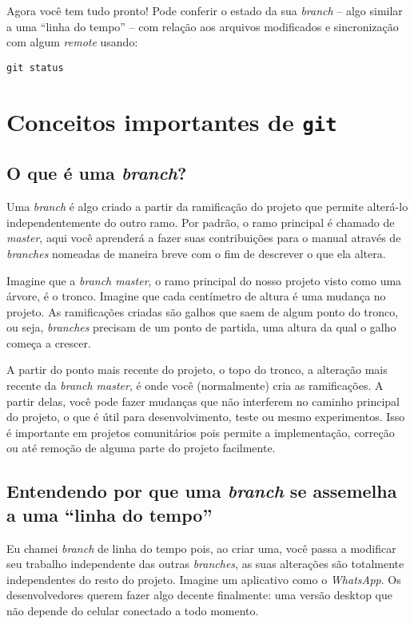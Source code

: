 \documentclass[a4paper,oneside,10pt]{memoir}
\begin{document}
Agora você tem tudo pronto! Pode conferir o estado da sua \emph{branch} --
algo similar a uma ``linha do tempo'' -- com relação aos arquivos modificados
e sincronização com algum \emph{remote} usando:

\begin{center}
\texttt{git status}
\end{center}

\section{Conceitos importantes de \texttt{git}}

\subsection{O que é uma \emph{branch}?}

Uma \emph{branch} é algo criado a partir da ramificação do projeto que permite
alterá-lo independentemente do outro ramo. Por padrão, o ramo principal é
chamado de \emph{master}, aqui você aprenderá a fazer suas contribuições para o
manual através de \emph{branches} nomeadas de maneira breve com o fim de
descrever o que ela altera.

Imagine que a \emph{branch master}, o ramo principal do nosso projeto visto
como uma árvore, é o tronco. Imagine que cada centímetro de altura é uma
mudança no projeto. As ramificações criadas são galhos que saem de algum ponto
do tronco, ou seja, \emph{branches} precisam de um ponto de partida, uma altura
da qual o galho começa a crescer.

A partir do ponto mais recente do projeto, o topo do tronco, a alteração mais
recente da \emph{branch master}, é onde você (normalmente) cria as
ramificações. A partir delas, você pode fazer mudanças que não interferem no
caminho principal do projeto, o que é útil para desenvolvimento, teste ou mesmo
experimentos. Isso é importante em projetos comunitários pois permite a
implementação, correção ou até remoção de alguma parte do projeto facilmente.

\subsection{Entendendo por que uma \emph{branch} se assemelha a uma ``linha do
tempo''}

Eu chamei \emph{branch} de linha do tempo pois, ao criar uma, você passa a
modificar seu trabalho independente das outras \emph{branches}, as suas
alterações são totalmente independentes do resto do projeto. Imagine um
aplicativo como o \emph{WhatsApp}. Os desenvolvedores querem fazer algo decente
finalmente: uma versão desktop que não depende do celular conectado a todo
momento.
\end{document}
